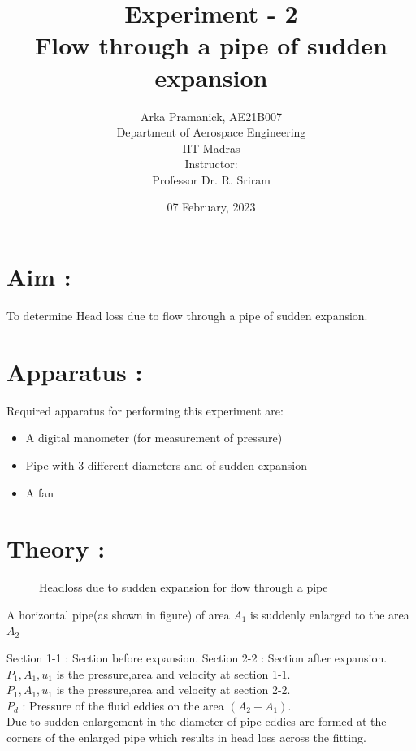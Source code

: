 \documentclass[12pt,a4paper]{article}
\title{Experiment - 2\\Flow through a pipe of sudden expansion}
\author{Arka Pramanick, AE21B007\\ Department of Aerospace Engineering\\ IIT Madras\\[3ex] Instructor:\\ \large Professor Dr. R. Sriram}
\date{07 February, 2023}
\begin{document}
\maketitle

\hline

\section{Aim :}
To determine Head loss due to flow through a pipe of sudden expansion.   
\section{Apparatus :}
Required apparatus for performing this experiment are:
\begin{itemize}
    \item A digital manometer (for measurement of pressure)
    \item Pipe  with 3 different diameters and of sudden expansion
    \item A fan
\end{itemize}
\section{Theory :}
\begin{figure}[!ht]
	\begin{center}
	\end{center}
	\caption{Headloss due to sudden expansion for flow through a pipe}
\end{figure}
A horizontal pipe(as shown in figure) of area $A_1$ is suddenly enlarged to the area $A_2$

Section 1-1 : Section before expansion.
Section 2-2 : Section after expansion.
$P_1,A_1,u_1$ is the pressure,area and velocity at section 1-1.\\
$P_1,A_1,u_1$ is the pressure,area and velocity at section 2-2.\\
$P_d$ : Pressure of the fluid eddies on the area $(A_2-A_1)$.\\
Due to sudden enlargement in the diameter of pipe eddies are formed at the corners of the enlarged pipe which results in head loss across the fitting.
\end{document}
